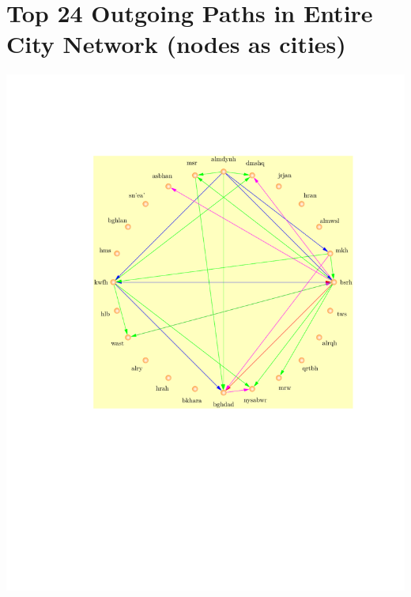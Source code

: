 \documentclass[12pt,english]{article}
\begin{document}
\newpage
\section{Top 24 Outgoing Paths in Entire City Network (nodes as cities)}
\vspace*{-3cm}
\hspace*{-4cm}
\includegraphics[scale=1]{top-paths/Hadith_Movement_Dragon_Diagram_Top_24_Paths.pdf}

\newpage
\end{document}
